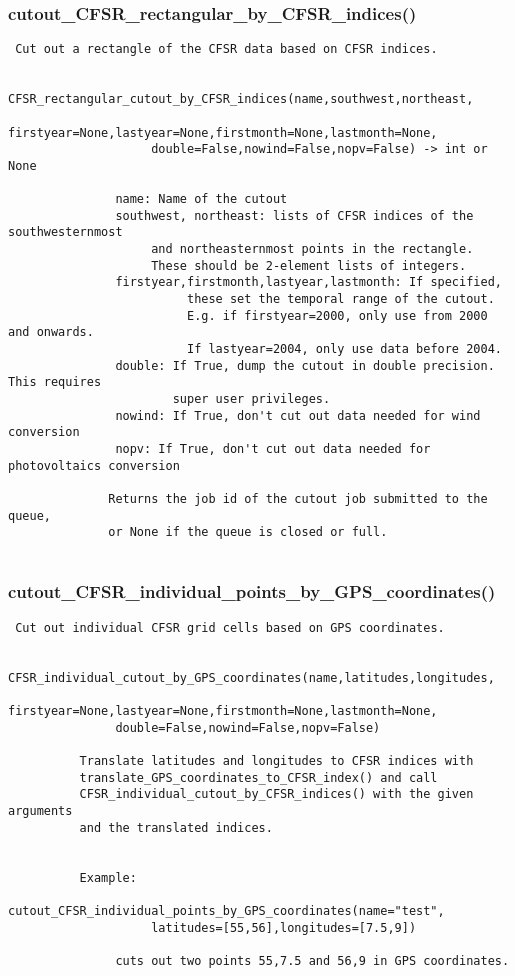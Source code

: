 \subsubsection{cutout\_CFSR\_rectangular\_by\_CFSR\_indices()}


\begin{verbatim}
 Cut out a rectangle of the CFSR data based on CFSR indices.

               CFSR_rectangular_cutout_by_CFSR_indices(name,southwest,northeast,
                    firstyear=None,lastyear=None,firstmonth=None,lastmonth=None,
                    double=False,nowind=False,nopv=False) -> int or None

               name: Name of the cutout
               southwest, northeast: lists of CFSR indices of the southwesternmost
                    and northeasternmost points in the rectangle.
                    These should be 2-element lists of integers.
               firstyear,firstmonth,lastyear,lastmonth: If specified,
                         these set the temporal range of the cutout.
                         E.g. if firstyear=2000, only use from 2000 and onwards.
                         If lastyear=2004, only use data before 2004.
               double: If True, dump the cutout in double precision. This requires
                       super user privileges.
               nowind: If True, don't cut out data needed for wind conversion
               nopv: If True, don't cut out data needed for photovoltaics conversion

              Returns the job id of the cutout job submitted to the queue,
              or None if the queue is closed or full.
                       
\end{verbatim}
\subsubsection{cutout\_CFSR\_individual\_points\_by\_GPS\_coordinates()}


\begin{verbatim}
 Cut out individual CFSR grid cells based on GPS coordinates.
          
          CFSR_individual_cutout_by_GPS_coordinates(name,latitudes,longitudes,
               firstyear=None,lastyear=None,firstmonth=None,lastmonth=None,
               double=False,nowind=False,nopv=False)
     
          Translate latitudes and longitudes to CFSR indices with
          translate_GPS_coordinates_to_CFSR_index() and call
          CFSR_individual_cutout_by_CFSR_indices() with the given arguments
          and the translated indices.
          
          
          Example:
               cutout_CFSR_individual_points_by_GPS_coordinates(name="test",
                    latitudes=[55,56],longitudes=[7.5,9])

               cuts out two points 55,7.5 and 56,9 in GPS coordinates.
          
          
\end{verbatim}
